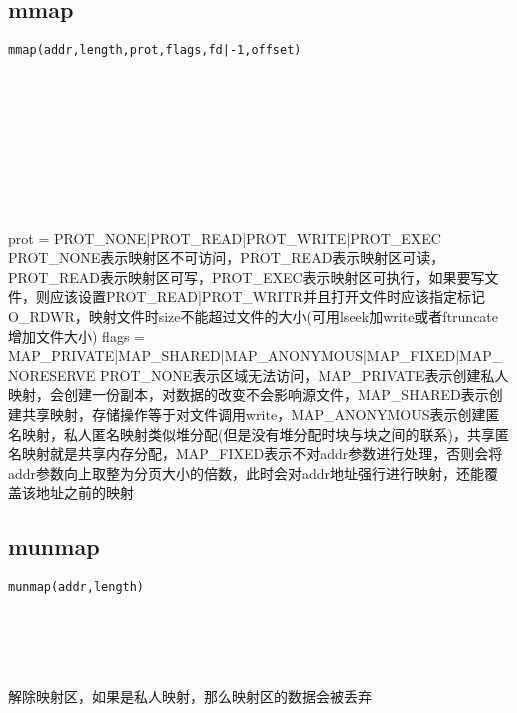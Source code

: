 \documentclass[10pt,a4paper]{article}
\begin{document}
\subsection{mmap}
\begin{spacing}{2.0}
\lstset{language=C,numbers=none}
\begin{lstlisting}
mmap(addr,length,prot,flags,fd|-1,offset)
\end{lstlisting}
{\large\color[rgb]{0.2,0.4,0.6}{addr:}} \\
{\large\color[rgb]{0.2,0.4,0.6}{length:}} \\
{\large\color[rgb]{0.2,0.4,0.6}{prot:}} \\
{\large\color[rgb]{0.2,0.4,0.6}{flags:}} \\
{\large\color[rgb]{0.2,0.4,0.6}{fd|-1:}} \\
{\large\color[rgb]{0.2,0.4,0.6}{offset:}}
\paragraph{ \ \ }prot = PROT\_NONE|PROT\_READ|PROT\_WRITE|PROT\_EXEC PROT\_NONE表示映射区不可访问，PROT\_READ表示映射区可读，PROT\_READ表示映射区可写，PROT\_EXEC表示映射区可执行，如果要写文件，则应该设置PROT\_READ|PROT\_WRITR并且打开文件时应该指定标记O\_RDWR，映射文件时size不能超过文件的大小(可用lseek加write或者ftruncate增加文件大小) flags = MAP\_PRIVATE|MAP\_SHARED|MAP\_ANONYMOUS|MAP\_FIXED|MAP\_NORESERVE PROT\_NONE表示区域无法访问，MAP\_PRIVATE表示创建私人映射，会创建一份副本，对数据的改变不会影响源文件，MAP\_SHARED表示创建共享映射，存储操作等于对文件调用write，MAP\_ANONYMOUS表示创建匿名映射，私人匿名映射类似堆分配(但是没有堆分配时块与块之间的联系)，共享匿名映射就是共享内存分配，MAP\_FIXED表示不对addr参数进行处理，否则会将addr参数向上取整为分页大小的倍数，此时会对addr地址强行进行映射，还能覆盖该地址之前的映射
\end{spacing}

\subsection{munmap}
\begin{spacing}{2.0}
\lstset{language=C,numbers=none}
\begin{lstlisting}
munmap(addr,length)
\end{lstlisting}
{\large\color[rgb]{0.2,0.4,0.6}{addr:}} \\
{\large\color[rgb]{0.2,0.4,0.6}{length:}}
\paragraph{ \ \ }解除映射区，如果是私人映射，那么映射区的数据会被丢弃
\end{spacing}
\end{document}
